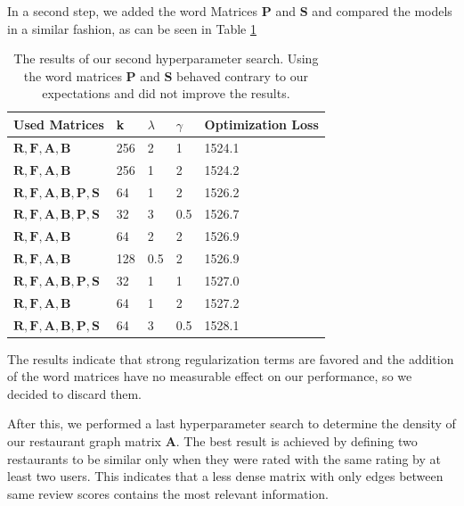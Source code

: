 \documentclass[a4paper]{article}
\begin{document}
In a second step, we added the word Matrices $\mathbf{P}$ and $\mathbf{S}$ and compared the models in a similar fashion, as can be seen in Table \ref{fig:mf_result}

\begin{table}[h]
\centering
\begin{tabular}{| l | l | l | l | l |}
\hline
Used Matrices & k & $\lambda$ & $\gamma$ & Optimization Loss \\ \hline
$\mathbf{R}, \mathbf{F}, \mathbf{A}, \mathbf{B}$  & 256 & 2 & 1 & 1524.1 \\ \hline
$\mathbf{R}, \mathbf{F}, \mathbf{A}, \mathbf{B}$ & 256 & 1 & 2 & 1524.2 \\ \hline
$\mathbf{R}, \mathbf{F}, \mathbf{A}, \mathbf{B}, \mathbf{P}, \mathbf{S}$ & 64 & 1 & 2 & 1526.2 \\ \hline
$\mathbf{R}, \mathbf{F}, \mathbf{A}, \mathbf{B}, \mathbf{P}, \mathbf{S}$ & 32 & 3 & 0.5 & 1526.7 \\ \hline
$\mathbf{R}, \mathbf{F}, \mathbf{A}, \mathbf{B}$  & 64 & 2 & 2 & 1526.9 \\ \hline
$\mathbf{R}, \mathbf{F}, \mathbf{A}, \mathbf{B}$  & 128 & 0.5 & 2 & 1526.9 \\ \hline
$\mathbf{R}, \mathbf{F}, \mathbf{A}, \mathbf{B}, \mathbf{P}, \mathbf{S}$ & 32 & 1 & 1 & 1527.0 \\ \hline
$\mathbf{R}, \mathbf{F}, \mathbf{A}, \mathbf{B}$  & 64 & 1 & 2 & 1527.2 \\ \hline
$\mathbf{R}, \mathbf{F}, \mathbf{A}, \mathbf{B}, \mathbf{P}, \mathbf{S}$ & 64 & 3 & 0.5 & 1528.1 \\
\hline
\end{tabular}
\caption{\label{fig:mf_result}The results of our second hyperparameter search. Using the word matrices $\mathbf{P}$ and $\mathbf{S}$ behaved contrary to our expectations and  did not improve the results.}
\end{table}

The results indicate that strong regularization terms are favored and the addition of the word matrices have no measurable effect on our performance, so we decided to discard them.

After this, we performed a last hyperparameter search to determine the density of our restaurant graph matrix $\mathbf{A}$. The best result is achieved by defining two restaurants to be similar only when they were rated with the same rating by at least two users. This indicates that a less dense matrix with only edges between same review scores contains the most relevant information.
\end{document}
